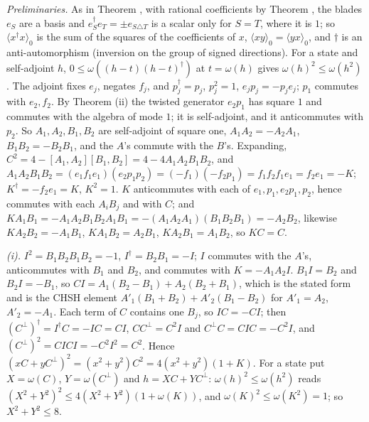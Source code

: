 \emph{Preliminaries.} As in Theorem , with rational coefficients by Theorem , the blades $e_{S}$ are a basis and $e_{S}^{\dagger}e_{T} = \pm e_{S \triangle T}$ is a scalar only for $S = T$, where it is $1$; so $\langle x^{\dagger}x\rangle_{0}$ is the sum of the squares of the coefficients of $x$, $\langle xy\rangle_{0} = \langle yx\rangle_{0}$, and $\dagger$ is an anti-automorphism (inversion on the group of signed directions). For a state and self-adjoint $h$, $0 \le \omega((h - t)(h - t)^{\dagger})$ at $t = \omega(h)$ gives $\omega(h)^{2} \le \omega(h^{2})$. The adjoint fixes $e_{j}$, negates $f_{j}$, and $p_{j}^{\dagger} = p_{j}$, $p_{j}^{2} = 1$, $e_{j}p_{j} = -p_{j}e_{j}$; $p_{1}$ commutes with $e_{2}, f_{2}$. By Theorem (ii) the twisted generator $e_{2}p_{1}$ has square $1$ and commutes with the algebra of mode $1$; it is self-adjoint, and it anticommutes with $p_{2}$. So $A_{1}, A_{2}, B_{1}, B_{2}$ are self-adjoint of square one, $A_{1}A_{2} = -A_{2}A_{1}$, $B_{1}B_{2} = -B_{2}B_{1}$, and the $A$'s commute with the $B$'s. Expanding, $C^{2} = 4 - [A_{1},A_{2}][B_{1},B_{2}] = 4 - 4A_{1}A_{2}B_{1}B_{2}$, and $A_{1}A_{2}B_{1}B_{2} = (e_{1}f_{1}e_{1})(e_{2}p_{1}p_{2}) = (-f_{1})(-f_{2}p_{1}) = f_{1}f_{2}f_{1}e_{1} = f_{2}e_{1} = -K$; $K^{\dagger} = -f_{2}e_{1} = K$, $K^{2} = 1$. $K$ anticommutes with each of $e_{1}, p_{1}, e_{2}p_{1}, p_{2}$, hence commutes with each $A_{i}B_{j}$ and with $C$; and $KA_{1}B_{1} = -A_{1}A_{2}B_{1}B_{2}A_{1}B_{1} = -(A_{1}A_{2}A_{1})(B_{1}B_{2}B_{1}) = -A_{2}B_{2}$, likewise $KA_{2}B_{2} = -A_{1}B_{1}$, $KA_{1}B_{2} = A_{2}B_{1}$, $KA_{2}B_{1} = A_{1}B_{2}$, so $KC = C$.

\emph{(i).} $I^{2} = B_{1}B_{2}B_{1}B_{2} = -1$, $I^{\dagger} = B_{2}B_{1} = -I$; $I$ commutes with the $A$'s, anticommutes with $B_{1}$ and $B_{2}$, and commutes with $K = -A_{1}A_{2}I$. $B_{1}I = B_{2}$ and $B_{2}I = -B_{1}$, so $CI = A_{1}(B_{2} - B_{1}) + A_{2}(B_{2} + B_{1})$, which is the stated form and is the CHSH element $A'_{1}(B_{1} + B_{2}) + A'_{2}(B_{1} - B_{2})$ for $A'_{1} = A_{2}$, $A'_{2} = -A_{1}$. Each term of $C$ contains one $B_{j}$, so $IC = -CI$; then $(C^{\perp})^{\dagger} = I^{\dagger}C = -IC = CI$, $CC^{\perp} = C^{2}I$ and $C^{\perp}C = CIC = -C^{2}I$, and $(C^{\perp})^{2} = CICI = -C^{2}I^{2} = C^{2}$. Hence $(xC + yC^{\perp})^{2} = (x^{2} + y^{2})C^{2} = 4(x^{2} + y^{2})(1 + K)$. For a state put $X = \omega(C)$, $Y = \omega(C^{\perp})$ and $h = XC + YC^{\perp}$: $\omega(h)^{2} \le \omega(h^{2})$ reads $(X^{2} + Y^{2})^{2} \le 4(X^{2} + Y^{2})(1 + \omega(K))$, and $\omega(K)^{2} \le \omega(K^{2}) = 1$; so $X^{2} + Y^{2} \le 8$.

